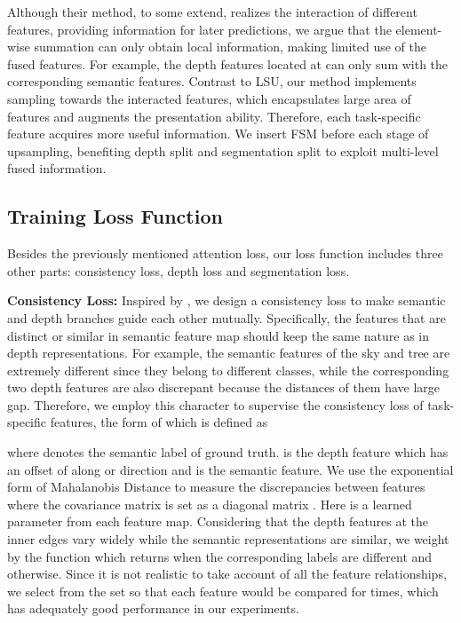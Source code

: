 \documentclass[sn-mathphys]{sn-jnl}
\theoremstyle{thmstyleone}\newtheorem{theorem}{Theorem}\newtheorem{proposition}[theorem]{Proposition}
\theoremstyle{thmstyletwo}\newtheorem{example}{Example}\newtheorem{remark}{Remark}
\theoremstyle{thmstylethree}\newtheorem{definition}{Definition}\usepackage[numbers,sort&compress]{natbib}
\begin{document}
Although their method, to some extend, realizes the interaction of different features, providing information for later predictions, we argue that the element-wise summation can only obtain local information, making limited use of the fused features. For example, the depth features located at  can only sum with the corresponding semantic features. Contrast to LSU, our method implements sampling towards the interacted features, which encapsulates large area of features and augments the presentation ability. Therefore, each task-specific feature acquires more useful information. We insert FSM before each stage of upsampling, benefiting depth split and segmentation split to exploit multi-level fused information.

\subsection{Training Loss Function}
Besides the previously mentioned attention loss, our loss function includes three other parts: consistency loss, depth loss and segmentation loss.

\textbf{Consistency Loss:} Inspired by \cite{guizilini2020semantically}, we design a consistency loss to make semantic and depth branches guide each other mutually. Specifically, the features that are distinct or similar in semantic feature map should keep the same nature as in depth representations. For example, the semantic features of the sky and tree are extremely different since they belong to different classes, while the corresponding two depth features are also discrepant because the distances of them have large gap. Therefore, we employ this character to supervise the consistency loss of task-specific features, the form of which is defined as

where  denotes the semantic label of ground truth.  is the depth feature which has an offset of  along  or  direction and  is the semantic feature.  We use the exponential form of Mahalanobis Distance to measure the discrepancies between features where the covariance matrix  is set as a diagonal matrix . Here  is a learned parameter from each feature map. Considering that the depth features at the inner edges vary widely while the semantic representations are similar, we weight  by the function  which returns  when the corresponding labels are different and  otherwise. Since it is not realistic to take account of all the feature relationships, we select  from the set  so that each feature would be compared for  times, which has adequately good performance in our experiments.
\end{document}
